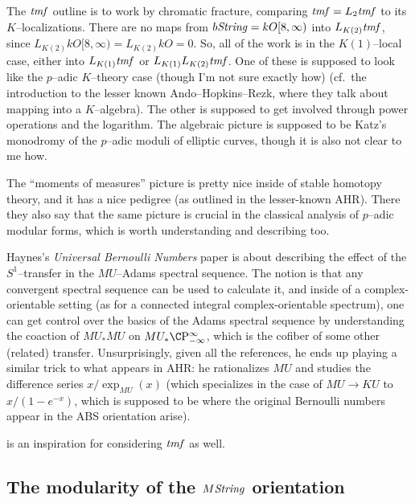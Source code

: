 The $\mathit{tmf}$ outline is to work by chromatic fracture, comparing $\mathit{tmf} = L_2 \mathit{tmf}$ to its $K$--localizations.  There are no maps from $b\mathit{String} = kO[8, \infty)$ into $L_{K(2)} \mathit{tmf}$, since $L_{K(2)} kO[8, \infty) = L_{K(2)} kO = 0$.  So, all of the work is in the $K(1)$--local case, either into $L_{K(1)} \mathit{tmf}$ or $L_{K(1)} L_{K(2)} \mathit{tmf}$.  One of these is supposed to look like the $p$--adic $K$--theory case (though I'm not sure exactly how) (cf.\ the introduction to the lesser known Ando--Hopkins--Rezk, where they talk about mapping into a $K$--algebra).  The other is supposed to get involved through power operations and the logarithm.  The algebraic picture is supposed to be Katz's monodromy of the $p$--adic moduli of elliptic curves, though it is also not clear to me how.



The ``moments of measures'' picture is pretty nice inside of stable homotopy theory, and it has a nice pedigree (as outlined in the lesser-known AHR).  There they also say that the same picture is crucial in the classical analysis of $p$--adic modular forms, which is worth understanding and describing too.



Haynes's \textit{Universal Bernoulli Numbers} paper is about describing the effect of the $S^1$--transfer in the $MU$--Adams spectral sequence.  The notion is that any convergent spectral sequence can be used to calculate it, and inside of a complex-orientable setting (as for a connected integral complex-orientable spectrum), one can get control over the basics of the Adams spectral sequence by understanding the coaction of $MU_* MU$ on $MU_* \CP{}_{-\infty}^{\infty}$, which is the cofiber of some other (related) transfer.  Unsurprisingly, given all the references, he ends up playing a similar trick to what appears in AHR: he rationalizes $MU$ and studies the difference series $x / \exp_{MU}(x)$ (which specializes in the case of $MU \to KU$ to $x / (1 - e^{-x})$, which is supposed to be where the original Bernoulli numbers appear in the ABS orientation arise).







 is an inspiration for considering $\mathit{tmf}$ as well.



\subsection*{The modularity of the $M\mathit{String}$ orientation}

